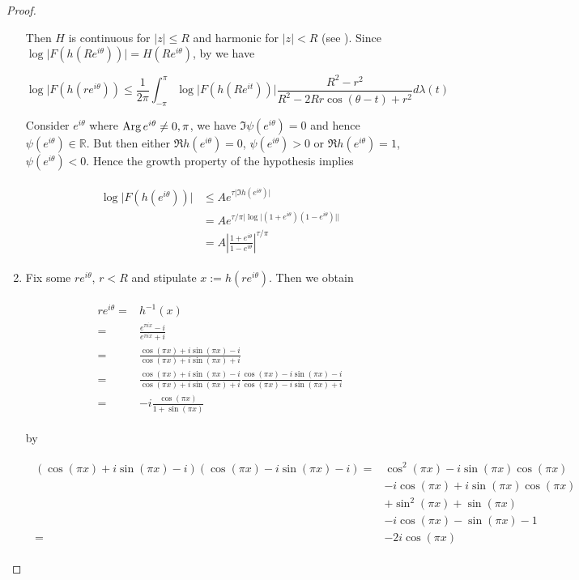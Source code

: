 \begin{proof}
\begin{enumerate}[label = \textbf{(\roman*.)}]
Then $H$ is continuous for $\vert z \vert \leqslant R$ and harmonic for $\vert z \vert < R$ (see \cite[234--235]{rudin:rc_analysis:1987}). Since $\log\vert F(h(Re^{i\theta}))\vert = H(Re^{i\theta})$, by \cite[336]{rudin:rc_analysis:1987} we have

\begin{equation}
	\log\vert F(h(re^{i\theta})) \leqslant \frac{1}{2\pi} \int_{-\pi}^\pi \log\vert F(h(Re^{it}))\vert \frac{R^2 - r^2}{R^2 - 2Rr\cos(\theta - t) + r^2} d\lambda(t) 
\end{equation}

Consider $e^{i\theta}$ where $\operatorname{Arg} e^{i\theta} \neq 0,\pi$, we have $\Im \psi(e^{i\theta}) = 0$ and hence $\psi(e^{i\theta}) \in \mathbb{R}$. But then either $\Re h(e^{i\theta}) = 0$, $\psi(e^{i\theta}) > 0$ or $\Re h(e^{i\theta}) = 1$, $\psi(e^{i\theta}) < 0$. Hence the growth property of the hypothesis implies

\begin{gather}
	\begin{aligned}
		\log \vert F(h(e^{i\theta})) \vert &\leqslant Ae^{\tau\vert \Im h(e^{i\theta})\vert}\\
		&= Ae^{\tau/\pi\vert \log\vert (1 + e^{i\theta})(1 - e^{i\theta})\vert\vert}\\
		&= A \left\vert \frac{1 + e^{i\theta}}{1 - e^{i\theta}} \right\vert^{\tau/\pi}
	\end{aligned}
\end{gather}

\item Fix some $re^{i\theta}$, $r < R$ and stipulate $x := h(re^{i\theta})$. Then we obtain

	\begin{gather}
		\begin{aligned}
			re^{i\theta} =& h^{-1}(x)\\
			=& \frac{e^{\pi i x}- i}{e^{\pi i x} + i}\\
			=& \frac{\cos(\pi x) + i\sin(\pi x) - i}{\cos(\pi x) + i\sin(\pi x) + i}\\
			=& \frac{\cos(\pi x) + i\sin(\pi x) - i}{\cos(\pi x) + i\sin(\pi x) + i}\frac{\cos(\pi x) - i\sin(\pi x) - i}{\cos(\pi x) - i\sin(\pi x) + i}\\
			=& -i \frac{\cos(\pi x)}{1 + \sin(\pi x)}
		\end{aligned}
	\end{gather}

	by

	\begin{gather*}
		\begin{aligned}
			\left(\cos(\pi x) + i\sin(\pi x) - i\right)\left(\cos(\pi x) - i\sin(\pi x) - i\right) =& \cos^2(\pi x) - i\sin(\pi x)\cos(\pi x)\\	
			& -i\cos(\pi x) + i\sin(\pi x)\cos(\pi x)\\
			& + \sin^2(\pi x) + \sin(\pi x)\\
			& -i \cos(\pi x) - \sin(\pi x) -1\\
			=& -2i \cos(\pi x)  
		\end{aligned}
	\end{gather*}


\end{enumerate}
\end{proof}
